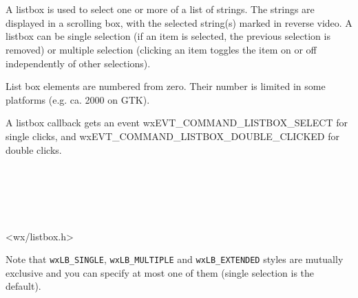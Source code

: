 \section{}\label{wxlistbox}

A listbox is used to select one or more of a list of strings. The
strings are displayed in a scrolling box, with the selected string(s)
marked in reverse video. A listbox can be single selection (if an item
is selected, the previous selection is removed) or multiple selection
(clicking an item toggles the item on or off independently of other
selections).

List box elements are numbered from zero. Their number is limited in
some platforms (e.g. ca. 2000 on GTK).

A listbox callback gets an event wxEVT\_COMMAND\_LISTBOX\_SELECT for single clicks, and
wxEVT\_COMMAND\_LISTBOX\_DOUBLE\_CLICKED for double clicks.


\\
\\
\\
\\


<wx/listbox.h>


\twocolwidtha{5cm}%
\begin{twocollist}\itemsep=0pt
\end{twocollist}

Note that {\tt wxLB\_SINGLE}, {\tt wxLB\_MULTIPLE} and {\tt wxLB\_EXTENDED}
styles are mutually exclusive and you can specify at most one of them (single
selection is the default).

